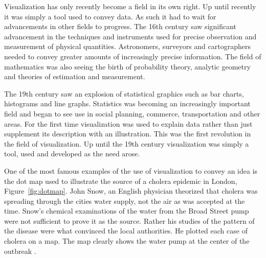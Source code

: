 \documentclass[a4paper, 10pt, titlepage, twocolumn, onehalfspace]{article}
\begin{document}
Visualization has only recently become a field in its own right. Up until recently it was simply a tool used to convey data. As such it had to wait for advancements in other fields to progress. The 16th century saw significant advancement in the techniques and instruments used for precise observation and measurement of physical quantities. Astronomers, surveyors and cartographers needed to convey greater amounts of increasingly precise information. The field of mathematics was also seeing the birth of probability theory, analytic geometry and theories of estimation and measurement.

The 19th century saw an explosion of statistical graphics \cite{friendly2001milestones} such as bar charts, histograms and line graphs. Statistics was becoming an increasingly important field and began to see use in social planning, commerce, transportation and other areas. For the first time visualization was used to explain data rather than just supplement its description with an illustration. This was the first revolution in the field of visualization. Up until the 19th century visualization was simply a tool, used and developed as the need arose.

One of the most famous examples of the use of visualization to convey an idea is the dot map used to illustrate the source of a cholera epidemic in London, Figure~\ref{fig:dotmap}. John Snow, an English physician theorized that cholera was spreading through the cities water supply, not the air as was accepted at the time. Snow's chemical examinations of the water from the Broad Street pump were not sufficient to prove it as the source. Rather his studies of the pattern of the disease were what convinced the local authorities. He plotted each case of cholera on a map. The map clearly shows the water pump at the center of the outbreak \cite{frerichs2007ghost}.
\end{document}

